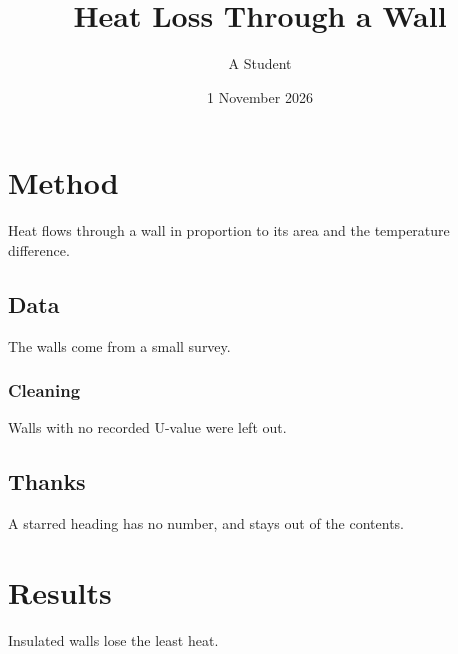 \documentclass[11pt,a4paper]{report}
\title{Heat Loss Through a Wall}
\author{A Student}
\date{1 November 2026}
\begin{document}
\maketitle
\tableofcontents

\chapter{Method}
Heat flows through a wall in proportion to its area and the temperature difference.

\section{Data}
The walls come from a small survey.

\subsection{Cleaning}
Walls with no recorded U-value were left out.

\section*{Thanks}
A starred heading has no number, and stays out of the contents.

\chapter{Results}
Insulated walls lose the least heat.
\end{document}
